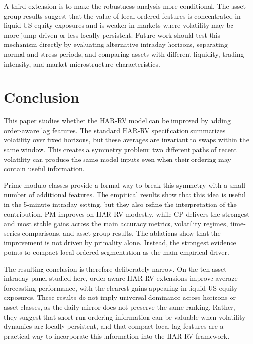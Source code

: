 \documentclass[11pt,a4paper]{article}
\renewcommand{\thesection}{\Roman{section}.}
\begin{document}
\noindent
A third extension is to make the robustness analysis more conditional. The asset-group results suggest that the value of local ordered features is concentrated in liquid US equity exposures and is weaker in markets where volatility may be more jump-driven or less locally persistent. Future work should test this mechanism directly by evaluating alternative intraday horizons, separating normal and stress periods, and comparing assets with different liquidity, trading intensity, and market microstructure characteristics.

\section{Conclusion}

\noindent
This paper studies whether the HAR-RV model can be improved by adding order-aware lag features. The standard HAR-RV specification summarizes volatility over fixed horizons, but these averages are invariant to swaps within the same window. This creates a symmetry problem: two different paths of recent volatility can produce the same model inputs even when their ordering may contain useful information.

\noindent
Prime modulo classes provide a formal way to break this symmetry with a small number of additional features. The empirical results show that this idea is useful in the 5-minute intraday setting, but they also refine the interpretation of the contribution. PM improves on HAR-RV modestly, while CP delivers the strongest and most stable gains across the main accuracy metrics, volatility regimes, time-series comparisons, and asset-group results. The ablations show that the improvement is not driven by primality alone. Instead, the strongest evidence points to compact local ordered segmentation as the main empirical driver.

\noindent
The resulting conclusion is therefore deliberately narrow. On the ten-asset intraday panel studied here, order-aware HAR-RV extensions improve average forecasting performance, with the clearest gains appearing in liquid US equity exposures. These results do not imply universal dominance across horizons or asset classes, as the daily mirror does not preserve the same ranking. Rather, they suggest that short-run ordering information can be valuable when volatility dynamics are locally persistent, and that compact local lag features are a practical way to incorporate this information into the HAR-RV framework.

\newpage
\appendix
\renewcommand{\thesection}{Appendix \Alph{section}}
\end{document}
